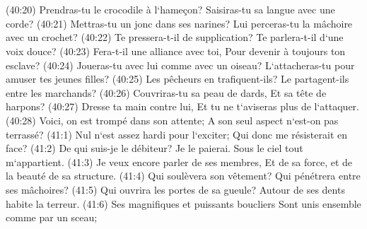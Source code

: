 \chapter{}

\verse (40:20) Prendras-tu le crocodile à l`hameçon? Saisiras-tu sa langue avec une corde? 
\verse (40:21) Mettras-tu un jonc dans ses narines? Lui perceras-tu la mâchoire avec un crochet? 
\verse (40:22) Te pressera-t-il de supplication? Te parlera-t-il d`une voix douce? 
\verse (40:23) Fera-t-il une alliance avec toi, Pour devenir à toujours ton esclave? 
\verse (40:24) Joueras-tu avec lui comme avec un oiseau? L`attacheras-tu pour amuser tes jeunes filles? 
\verse (40:25) Les pêcheurs en trafiquent-ils? Le partagent-ils entre les marchands? 
\verse (40:26) Couvriras-tu sa peau de dards, Et sa tête de harpons? 
\verse (40:27) Dresse ta main contre lui, Et tu ne t`aviseras plus de l`attaquer. 
\verse (40:28) Voici, on est trompé dans son attente; A son seul aspect n`est-on pas terrassé? 
\verse (41:1) Nul n`est assez hardi pour l`exciter; Qui donc me résisterait en face? 
\verse (41:2) De qui suis-je le débiteur? Je le paierai. Sous le ciel tout m`appartient. 
\verse (41:3) Je veux encore parler de ses membres, Et de sa force, et de la beauté de sa structure. 
\verse (41:4) Qui soulèvera son vêtement? Qui pénétrera entre ses mâchoires? 
\verse (41:5) Qui ouvrira les portes de sa gueule? Autour de ses dents habite la terreur. 
\verse (41:6) Ses magnifiques et puissants boucliers Sont unis ensemble comme par un sceau; 
